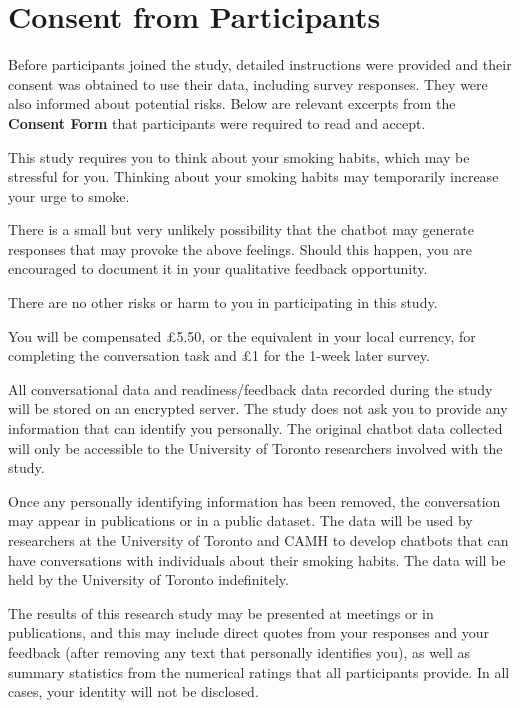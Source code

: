 \chapter{Consent from Participants}
\label{app-consent}


Before participants joined the study, detailed instructions were provided and their consent was obtained to use their data, including survey responses. They were also informed about potential risks. Below are relevant excerpts from the \textbf{Consent Form} that participants were required to read and accept.
    

\vspace{12pt}

\begin{tcolorbox}[breakable,title=WHAT ARE THE RISKS OR HARM OF PARTICIPATING IN THIS STUDY?]
This study requires you to think about your smoking habits, which may be stressful for you. Thinking about your smoking habits may temporarily increase your urge to smoke. 

There is a small but very unlikely possibility that the chatbot may generate responses that may provoke the above feelings. Should this happen, you are encouraged to document it in your qualitative feedback opportunity.

There are no other risks or harm to you in participating in this study.
\end{tcolorbox}

\vspace{12pt}

\begin{tcolorbox}[breakable,title=WHAT COMPENSATION AM I ENTITLED TO?]
You will be compensated £5.50, or the equivalent in your local currency, for completing the conversation task and £1 for the 1-week later survey.
\end{tcolorbox}

\vspace{12pt}

\begin{tcolorbox}[breakable,title=HOW WILL MY PRIVACY BE RESPECTED?]
All conversational data and readiness/feedback data recorded during the study will be stored on an encrypted server. The study does not ask you to provide any information that can identify you personally. The original chatbot data collected will only be accessible to the University of Toronto researchers involved with the study.

Once any personally identifying information has been removed, the conversation may appear in publications or in a public dataset. The data will be used by researchers at the University of Toronto and CAMH to develop chatbots that can have conversations with individuals about their smoking habits. The data will be held by the University of Toronto indefinitely.

The results of this research study may be presented at meetings or in publications, and this may include direct quotes from your responses and your feedback (after removing any text that personally identifies you), as well as summary statistics from the numerical ratings that all participants provide. In all cases, your identity will not be disclosed.
\end{tcolorbox}
